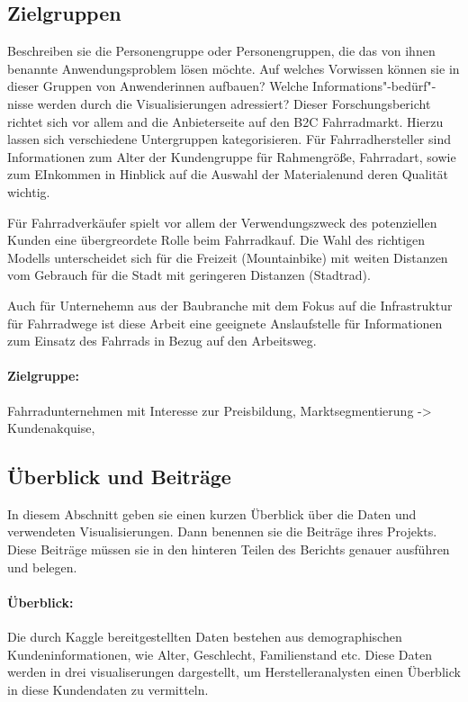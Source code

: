 \documentclass[usegeometry=true]{scrartcl}
\begin{document}
\subsection{Zielgruppen}
Beschreiben sie die Personengruppe oder Personengruppen, die das von ihnen benannte Anwendungsproblem lösen möchte. Auf welches Vorwissen können sie in dieser Gruppen von Anwenderinnen aufbauen? Welche Informations"-bedürf"-nisse werden durch die Visualisierungen adressiert?
Dieser Forschungsbericht richtet sich vor allem and die Anbieterseite auf den B2C Fahrradmarkt. Hierzu lassen sich verschiedene Untergruppen kategorisieren. 
Für Fahrradhersteller sind Informationen zum Alter der Kundengruppe für Rahmengröße, Fahrradart, sowie zum EInkommen in Hinblick auf die Auswahl der Materialenund deren Qualität wichtig. 

Für Fahrradverkäufer spielt vor allem der Verwendungszweck des potenziellen Kunden eine übergreordete Rolle beim Fahrradkauf. Die Wahl des richtigen Modells unterscheidet sich für die Freizeit (Mountainbike) mit weiten Distanzen vom Gebrauch für die Stadt mit geringeren Distanzen (Stadtrad). 

Auch für Unternehemn aus der Baubranche mit dem Fokus auf die Infrastruktur für Fahrradwege ist diese Arbeit eine geeignete Anslaufstelle für Informationen zum Einsatz des Fahrrads in Bezug auf den Arbeitsweg. 


\paragraph{Zielgruppe:}Fahrradunternehmen mit Interesse zur Preisbildung, Marktsegmentierung -> Kundenakquise, 
\subsection{Überblick und Beiträge}
In diesem Abschnitt geben sie einen kurzen Überblick über die Daten und verwendeten Visualisierungen. Dann benennen sie die Beiträge ihres Projekts. Diese Beiträge müssen sie in den hinteren Teilen des Berichts genauer ausführen und belegen.
\paragraph{Überblick:}
Die durch Kaggle bereitgestellten Daten bestehen aus demographischen Kundeninformationen, wie Alter, Geschlecht, Familienstand etc. Diese Daten werden in drei visualiserungen dargestellt, um Herstelleranalysten einen Überblick in diese Kundendaten zu vermitteln.
\end{document}
